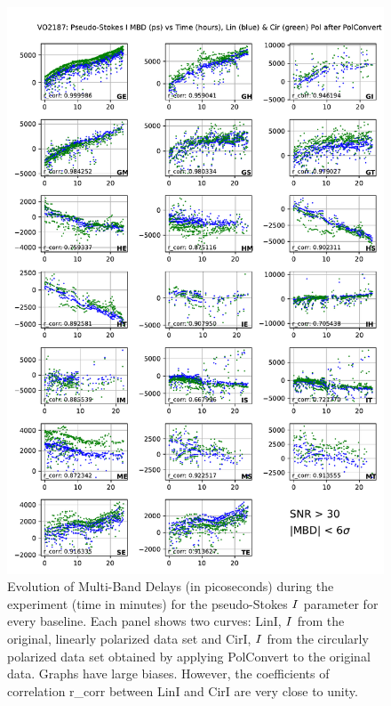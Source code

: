 \documentclass[letterpaper,twoside,12pt]{article}
\begin{document}
\begin{figure}[ht!]
  \begin{center}
  \includegraphics[width=33pc]{VO2187_MBD_Lin_I_and_Cir_I_SNR_floor_30.pdf}
  \caption{\small Evolution of Multi-Band Delays (in picoseconds) during the experiment (time in minutes) for the pseudo-Stokes $\protect I$ parameter for every baseline. Each panel shows two curves: LinI, $\protect I$ from the original, linearly polarized data set and CirI, $\protect I$ from the circularly polarized data set obtained by applying PolConvert to the original data. Graphs have large biases. However, the coefficients of correlation r\_corr between LinI and CirI are very close to unity.}
  \label{mbd_lin_and_cir}
  \end{center}
\end{figure}
\end{document}
